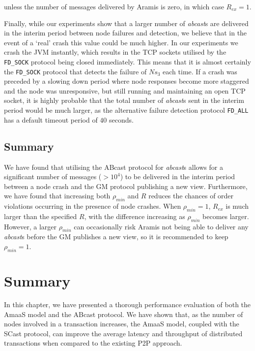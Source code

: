     \noindent unless the number of messages delivered by \textsf{Aramis} is zero, in which case $R_{ex} = 1$.  
    
    Finally, while our experiments show that a larger number of \emph{abcast}s are delivered in the interim period between node failures and detection, we believe that in the event of a \textquoteleft{}real' crash this value could be much higher.  In our experiments we crash the JVM instantly, which results in the TCP sockets utilised by the \texttt{FD\_SOCK} protocol being closed immediately.  This means that it is almost certainly the \texttt{FD\_SOCK} protocol that detects the failure of $Ns_3$ each time.  If a crash was preceded by a slowing down period where node responses become more staggered and the node was unresponsive, but still running and maintaining an open TCP socket, it is highly probable that the total number of \emph{abcast}s sent in the interim period would be much larger, as the alternative failure detection protocol \texttt{FD\_ALL} has a default timeout period of $40$ seconds.  
        
    \subsection{Summary}
        We have found that utilising the \textsf{ABcast} protocol for \emph{abcast}s allows for a significant number of messages ($> 10^4$) to be delivered in the interim period between a node crash and the GM protocol publishing a new view.  Furthermore, we have found that increasing both $\rho_{min}$ and $R$ reduces the chances of order violations occurring in the presence of node crashes.  When $\rho_{min} = 1$, $R_{ex}$ is much larger than the specified $R$, with the difference increasing as $\rho_{min}$ becomes larger.  However, a larger $\rho_{min}$ can occasionally risk \textsf{Aramis} not being able to deliver any \emph{abcast}s before the GM publishes a new view, so it is recommended to keep $\rho_{min}=1$.  
          
\section{Summary}
In this chapter, we have presented a thorough performance evaluation of both the \textsf{AmaaS} model and the \textsf{ABcast} protocol.  We have shown that, as the number of nodes involved in a transaction increases, the \textsf{AmaaS} model, coupled with the \textsf{SCast} protocol, can improve the average latency and throughput of distributed transactions when compared to the existing P2P approach.  

